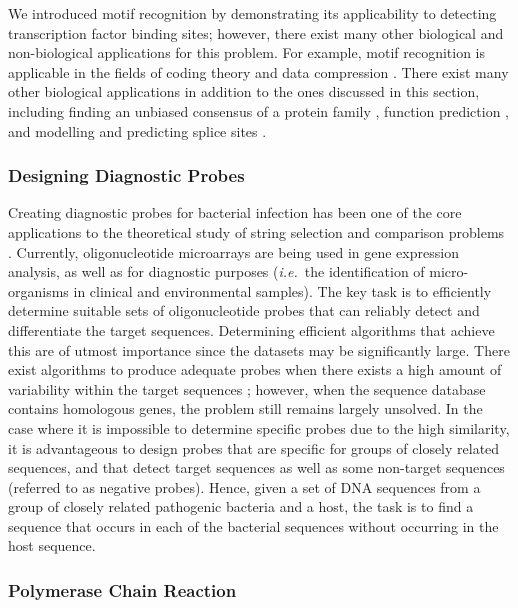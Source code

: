 We introduced motif recognition by demonstrating its applicability to detecting transcription factor binding sites; however, there exist many other biological and non-biological applications for this problem. For example, motif recognition is applicable in the fields of coding theory \cite{CHLS97,FL97} and data compression \cite{GS85}.   There exist many other biological applications in addition to the ones discussed in this section, including finding an unbiased consensus of a protein family \cite{BLPR}, function prediction \cite{gusfield,asmith}, and modelling and predicting splice sites \cite{barnes}.

\subsubsection{Designing Diagnostic Probes}

Creating diagnostic probes for bacterial infection has been one of the core applications to the theoretical study of string selection and comparison problems \cite{BLPR,LLMWZ00,macario}.   Currently, oligonucleotide microarrays are being used in gene expression analysis, as well as for diagnostic purposes ({\em i.e.}\ the identification of micro-organisms in clinical and environmental samples). The key task is to efficiently determine suitable sets of oligonucleotide probes that can reliably detect and differentiate the target sequences.  Determining efficient algorithms that achieve this are of utmost importance since the datasets may be significantly large.  There exist algorithms to produce adequate probes when there exists a high amount of variability within the target sequences \cite{KS02,krause}; however, when the sequence database contains homologous genes, the problem still remains largely unsolved. In the case where it is impossible to determine specific probes due to the high similarity, it is advantageous to design probes that are specific for groups of closely related sequences, and that detect target sequences as well as some non-target sequences (referred to as negative probes).  Hence, given a set of DNA sequences from a group of closely related pathogenic bacteria and a host, the task is to find a sequence that occurs in each of the bacterial sequences without occurring in the host sequence.  

\subsubsection{Polymerase Chain Reaction}

